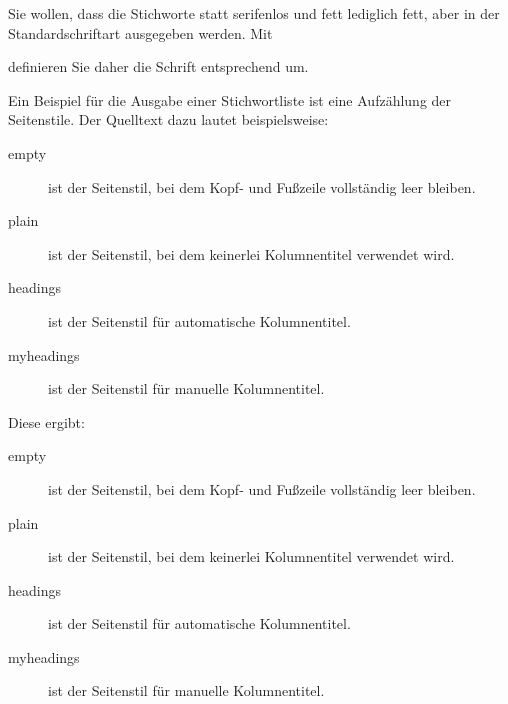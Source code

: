     \begin{Example}
      Sie wollen, dass die Stichworte statt serifenlos und fett lediglich
      fett, aber in der Standardschriftart ausgegeben werden. Mit
\begin{lstcode}
\end{lstcode}
      definieren Sie daher die Schrift entsprechend um.

      Ein Beispiel für die Ausgabe einer Stichwortliste ist eine Aufzählung
      der Seitenstile. Der Quelltext dazu lautet beispielsweise:
\begin{lstcode}
  \begin{description}
    \item[empty] ist der Seitenstil, bei dem Kopf- 
      und Fußzeile vollständig leer bleiben.
    \item[plain] ist der Seitenstil, bei dem 
      keinerlei Kolumnentitel verwendet wird.
    \item[headings] ist der Seitenstil für 
      automatische Kolumnentitel.
    \item[myheadings] ist der Seitenstil für 
      manuelle Kolumnentitel.
  \end{description}
\end{lstcode}
      Diese ergibt:
      \begin{ShowOutput}
        \begin{description}
        \item[empty] ist der Seitenstil, bei dem Kopf- und
          Fußzeile vollständig leer bleiben.
        \item[plain] ist der Seitenstil, bei dem keinerlei
          Kolumnentitel verwendet wird.
        \item[headings] ist der Seitenstil für automatische
          Kolumnentitel.
        \item[myheadings] ist der Seitenstil für manuelle
          Kolumnentitel.
        \end{description}
      \end{ShowOutput}
    \end{Example}%
  \fi
  \EndIndexGroup%
\fi

